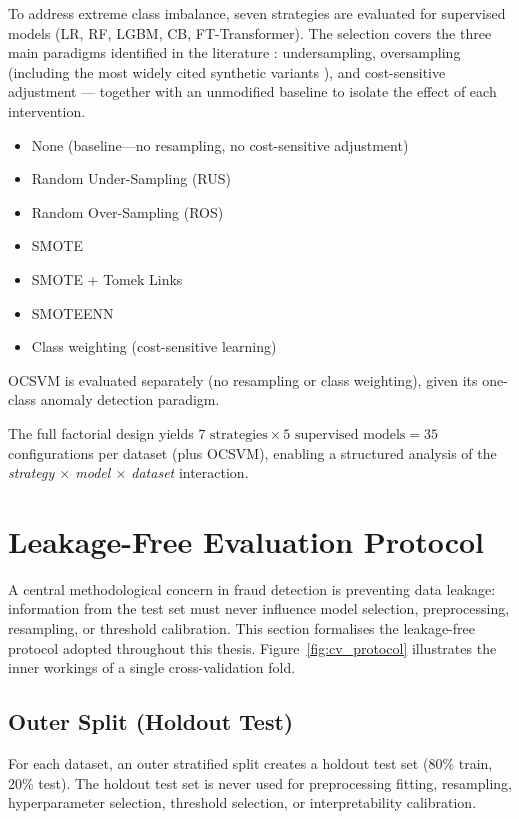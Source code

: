 To address extreme class imbalance, seven strategies are evaluated for supervised models (LR, RF, LGBM, CB, FT-Transformer). The selection covers the three main paradigms identified in the literature \cite{hegarcia2009learning, krawczyk2016learning}: undersampling, oversampling (including the most widely cited synthetic variants \cite{chawla2002smote, batista2004balancing}), and cost-sensitive adjustment — together with an unmodified baseline to isolate the effect of each intervention.
\begin{itemize}
  \item None (baseline---no resampling, no cost-sensitive adjustment)
  \item Random Under-Sampling (RUS)
  \item Random Over-Sampling (ROS)
  \item SMOTE \cite{chawla2002smote}
  \item SMOTE + Tomek Links \cite{batista2004balancing}
  \item SMOTEENN \cite{batista2004balancing}
  \item Class weighting (cost-sensitive learning)
\end{itemize}

OCSVM is evaluated separately (no resampling or class weighting), given its one-class anomaly detection paradigm.

The full factorial design yields $7 \text{ strategies} \times 5 \text{ supervised models} = 35$ configurations per dataset (plus OCSVM), enabling a structured analysis of the \emph{strategy $\times$ model $\times$ dataset} interaction.

\section{Leakage-Free Evaluation Protocol}
\label{sec:protocol}

A central methodological concern in fraud detection is preventing data leakage: information from the test set must never influence model selection, preprocessing, resampling, or threshold calibration. This section formalises the leakage-free protocol adopted throughout this thesis. Figure~\ref{fig:cv_protocol} illustrates the inner workings of a single cross-validation fold.

\subsection{Outer Split (Holdout Test)}
For each dataset, an outer stratified split creates a holdout test set (80\% train, 20\% test). The holdout test set is never used for preprocessing fitting, resampling, hyperparameter selection, threshold selection, or interpretability calibration.

